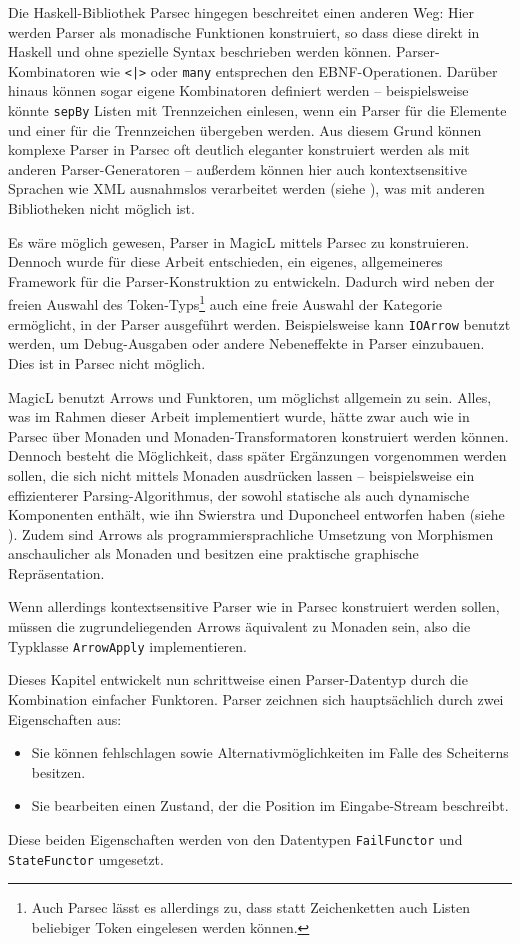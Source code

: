 \documentclass[12pt, a4paper, bibgerm]{scrbook}
\newcommand\icode[1]{\lstinline?#1?}
\begin{document}
Die Haskell-Bibliothek Parsec \cite{Parsec} hingegen beschreitet einen
anderen Weg: Hier werden Parser als monadische Funktionen konstruiert,
so dass diese direkt in Haskell und ohne spezielle Syntax beschrieben
werden können. Parser-Kombinatoren wie \icode{<|>} oder \icode{many}
entsprechen den EBNF-Operationen. Darüber hinaus können sogar eigene
Kombinatoren definiert werden -- beispielsweise könnte \icode{sepBy}
Listen mit Trennzeichen einlesen, wenn ein Parser für die Elemente und
einer für die Trennzeichen übergeben werden. Aus diesem Grund können
komplexe Parser in Parsec oft deutlich eleganter konstruiert werden als
mit anderen Parser-Generatoren -- außerdem können hier auch
kontextsensitive Sprachen wie XML ausnahmslos verarbeitet werden (siehe
\cite[S. 3]{Parsec}), was mit anderen Bibliotheken nicht möglich ist.

Es wäre möglich gewesen, Parser in MagicL mittels Parsec zu
konstruieren. Dennoch wurde für diese Arbeit entschieden, ein eigenes,
allgemeineres Framework für die Parser-Konstruktion zu
entwickeln. Dadurch wird neben der freien Auswahl des
Token-Typs\footnote{Auch Parsec lässt es allerdings zu, dass statt
  Zeichenketten auch Listen beliebiger Token eingelesen werden können.}
auch eine freie Auswahl der Kategorie ermöglicht, in der Parser
ausgeführt werden. Beispielsweise kann \icode{IOArrow} benutzt werden,
um Debug-Ausgaben oder andere Nebeneffekte in Parser einzubauen. Dies
ist in Parsec nicht möglich.

MagicL benutzt Arrows und Funktoren, um möglichst allgemein zu
sein. Alles, was im Rahmen dieser Arbeit implementiert wurde, hätte zwar
auch wie in Parsec über Monaden und Monaden-Transformatoren konstruiert
werden können. Dennoch besteht die Möglichkeit, dass später Ergänzungen
vorgenommen werden sollen, die sich nicht mittels Monaden ausdrücken
lassen -- beispielsweise ein effizienterer Parsing-Algorithmus, der
sowohl statische als auch dynamische Komponenten enthält, wie ihn
Swierstra und Duponcheel entworfen haben (siehe
\cite[S. 8ff]{Hughes}). Zudem sind Arrows als programmiersprachliche
Umsetzung von Morphismen anschaulicher als Monaden und besitzen eine
praktische graphische Repräsentation.

Wenn allerdings kontextsensitive Parser wie in Parsec konstruiert werden
sollen, müssen die zugrundeliegenden Arrows äquivalent zu Monaden sein,
also die Typklasse \icode{ArrowApply} implementieren.

Dieses Kapitel entwickelt nun schrittweise einen Parser-Datentyp durch
die Kombination einfacher Funktoren. Parser zeichnen sich hauptsächlich
durch zwei Eigenschaften aus:
\begin{itemize}
\item Sie können fehlschlagen sowie Alternativmöglichkeiten im Falle des
  Scheiterns besitzen.
\item Sie bearbeiten einen Zustand, der die Position im Eingabe-Stream
  beschreibt.
\end{itemize}
Diese beiden Eigenschaften werden von den Datentypen \icode{FailFunctor}
und \icode{StateFunctor} umgesetzt.
\end{document}
